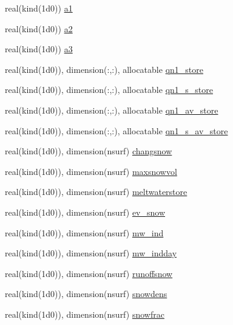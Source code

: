 \begin{DoxyCompactItemize}
\item 
real(kind(1d0)) \hyperlink{namespaceallocatearray_ad46985325048552753cfa81641ff8b0f}{a1}
\item 
real(kind(1d0)) \hyperlink{namespaceallocatearray_a0cad51c36be0d8e5f907e24f9c391e4e}{a2}
\item 
real(kind(1d0)) \hyperlink{namespaceallocatearray_ac17d9365b9163e951de7ce3f5fa21897}{a3}
\item 
real(kind(1d0)), dimension(\+:,\+:), allocatable \hyperlink{namespaceallocatearray_aef0f065addcafc27e8adbf9c9f9f867f}{qn1\+\_\+store}
\item 
real(kind(1d0)), dimension(\+:,\+:), allocatable \hyperlink{namespaceallocatearray_a29c0ea0741af8fff0b282998c49da9a1}{qn1\+\_\+s\+\_\+store}
\item 
real(kind(1d0)), dimension(\+:,\+:), allocatable \hyperlink{namespaceallocatearray_ad5f385f647d84ed863fbfe5ae0754b28}{qn1\+\_\+av\+\_\+store}
\item 
real(kind(1d0)), dimension(\+:,\+:), allocatable \hyperlink{namespaceallocatearray_a7d2779bd8ecaa17c3f07c18a936d2150}{qn1\+\_\+s\+\_\+av\+\_\+store}
\item 
real(kind(1d0)), dimension(nsurf) \hyperlink{namespaceallocatearray_a215dffcb1ced9f49787128f695cbf8d7}{changsnow}
\item 
real(kind(1d0)), dimension(nsurf) \hyperlink{namespaceallocatearray_aec874041558b5b832c4ebefb21848bef}{maxsnowvol}
\item 
real(kind(1d0)), dimension(nsurf) \hyperlink{namespaceallocatearray_acb39841a5a6d5dbe37a556535c505311}{meltwaterstore}
\item 
real(kind(1d0)), dimension(nsurf) \hyperlink{namespaceallocatearray_a6bf4d6d59ed380463ac60fb9d4f382b6}{ev\+\_\+snow}
\item 
real(kind(1d0)), dimension(nsurf) \hyperlink{namespaceallocatearray_aa072ff6c84e33695ad3f23bc7608a022}{mw\+\_\+ind}
\item 
real(kind(1d0)), dimension(nsurf) \hyperlink{namespaceallocatearray_a8352821f2496bf32d16cadfd727d69a2}{mw\+\_\+indday}
\item 
real(kind(1d0)), dimension(nsurf) \hyperlink{namespaceallocatearray_ad99e95bac5bad1e8fd7ae73daf74933e}{runoffsnow}
\item 
real(kind(1d0)), dimension(nsurf) \hyperlink{namespaceallocatearray_ac7b06ad52874f40a2c456863ffa3d262}{snowdens}
\item 
real(kind(1d0)), dimension(nsurf) \hyperlink{namespaceallocatearray_afddcfa297d34e2f62378a4de75940afb}{snowfrac}

\end{DoxyCompactItemize}
